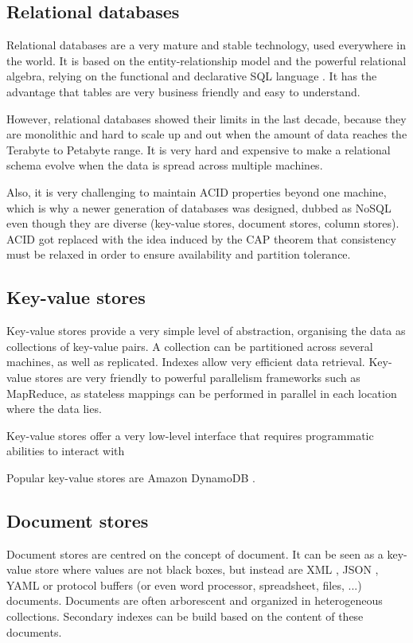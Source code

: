 \documentclass{vldb}
\begin{document}
\subsection{Relational databases}

Relational databases are a very mature and stable technology, used everywhere in the world. It is based on the entity-relationship model and the powerful relational algebra, relying on the functional and declarative SQL language \cite{Chamberlin1974}. It has the advantage that tables are very business friendly and easy to understand.

However, relational databases showed their limits in the last decade, because they are monolithic and hard to scale up and out when the amount of data reaches the Terabyte to Petabyte range. It is very hard and expensive to make a relational schema evolve when the data is spread across multiple machines.

Also, it is very challenging to maintain ACID properties \cite{Haerder1983} beyond one machine, which is why a newer generation of databases was designed, dubbed as NoSQL even though they are diverse (key-value stores, document stores, column stores). ACID got replaced with the idea induced by the CAP theorem \cite{Gilbert2002} that consistency must be relaxed in order to ensure availability and partition tolerance.

\subsection{Key-value stores}

Key-value stores provide a very simple level of abstraction, organising the data as collections of key-value pairs. A collection can be partitioned across several machines, as well as replicated. Indexes allow very efficient data retrieval. Key-value stores are very friendly to powerful parallelism frameworks such as MapReduce, as stateless mappings can be performed in parallel in each location where the data lies.

Key-value stores offer a very low-level interface that requires programmatic abilities to interact with

Popular key-value stores are Amazon DynamoDB \cite{DeCandia2007}.

\subsection{Document stores}

Document stores are centred on the concept of document. It can be seen as a key-value store where values are not black boxes, but instead are XML \cite{XML}, JSON \cite{JSON}, YAML \cite{YAML} or protocol buffers \cite{ProtocolBuffers} (or even word processor, spreadsheet, files, ...) documents. Documents are often arborescent and organized in heterogeneous collections. Secondary indexes can be build based on the content of these documents.
\end{document}

